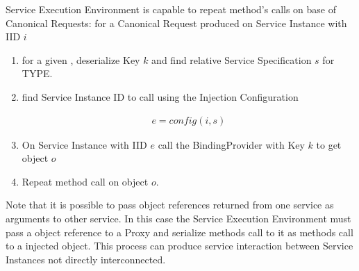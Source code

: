 Service Execution Environment is capable to repeat method's calls on base of Canonical Requests: for a Canonical Request produced on Service Instance with IID $i$
\begin{enumerate}
 \item for a given , deserialize Key $k$ and find relative Service Specification $s$ for TYPE.
 \item find Service Instance ID to call using the Injection Configuration

\begin{eqnarray}
e = config(i,s)
\end{eqnarray}

 \item On Service Instance with IID $e$ call the BindingProvider with Key $k$ to get object $o$
 \item Repeat method call on object $o$.
\end{enumerate}


Note that it is possible to pass object references returned from one service as arguments to other service. In this case the Service Execution Environment must pass a object reference to a Proxy and serialize methods call to it as methods call to a injected object. This process can produce service interaction between Service Instances not directly interconnected.

